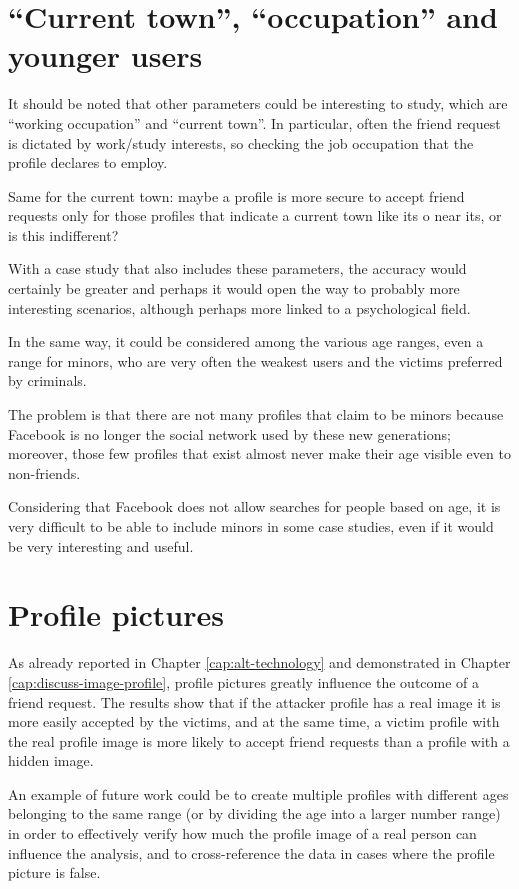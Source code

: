 \section{``Current town'', ``occupation'' and younger users}
\label{cap:town-occupation}
It should be noted that other parameters could be interesting to study, which are ``working occupation'' and ``current town''. In particular, often the friend request is dictated by work/study interests, so checking the job occupation that the profile declares to employ. \par \noindent 
Same for the current town: maybe a profile is more secure to accept friend requests only for those profiles that indicate a current town like its o near its, or is this indifferent?\par \noindent 
With a case study that also includes these parameters, the accuracy would certainly be greater and perhaps it would open the way to probably more interesting scenarios, although perhaps more linked to a psychological field.\par \noindent 
In the same way, it could be considered among the various age ranges, even a range for minors, who are very often the weakest users and the victims preferred by criminals.\par \noindent The problem is that there are not many profiles that claim to be minors because Facebook is no longer the social network used by these new generations; moreover, those few profiles that exist almost never make their age visible even to non-friends.\par \noindent 
Considering that Facebook does not allow searches for people based on age, it is very difficult to be able to include minors in some case studies, even if it would be very interesting and useful.

\section{Profile pictures}
As already reported in Chapter \ref{cap:alt-technology} and demonstrated in Chapter \ref{cap:discuss-image-profile}, profile pictures greatly influence the outcome of a friend request. The results show that if the attacker profile has a real image it is more easily accepted by the victims, and at the same time, a victim profile with the real profile image is more likely to accept friend requests than a profile with a hidden image. \par \noindent 
An example of future work could be to create multiple profiles with different ages belonging to the same range (or by dividing the age into a larger number range) in order to effectively verify how much the profile image of a real person can influence the analysis, and to cross-reference the data in cases where the profile picture is false.
